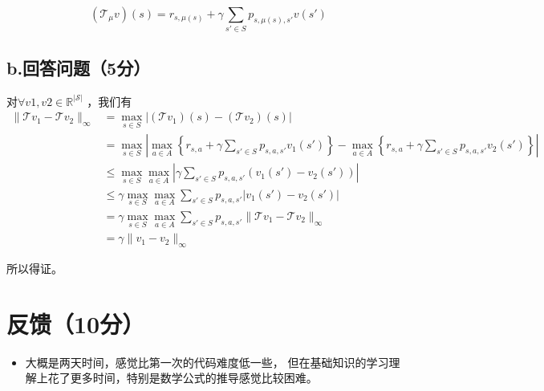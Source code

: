 \documentclass{article}
\begin{document}
\[
(\mathcal{T}_\mu v)(s) = r_{s,\mu(s)} + \gamma \sum_{s' \in S} p_{s,\mu(s),s'} v(s')
\]
\subsection*{b.回答问题（5分）}
对$\forall  v1, v2 \in \mathbb{R}^{|\mathcal{S}|}$
，我们有\begin{align*}
    \|\mathcal{T} v_1 - \mathcal{T} v_2\|_\infty &= \max_{s \in S} |(\mathcal{T} v_1)(s) - (\mathcal{T} v_2)(s)| \\
    &= \max_{s \in S} \left|\max_{a \in A} \left\{r_{s,a} + \gamma \sum_{s' \in S} p_{s,a,s'} v_1(s')\right\} - \max_{a \in A} \left\{r_{s,a} + \gamma \sum_{s' \in S} p_{s,a,s'} v_2(s')\right\}\right| \\
    &\leq \max_{s \in S} \max_{a \in A} \left|\gamma \sum_{s' \in S} p_{s,a,s'} (v_1(s') - v_2(s'))\right| \\
    &\leq \gamma \max_{s \in S} \max_{a \in A} \sum_{s' \in S} p_{s,a,s'} |v_1(s') - v_2(s')| \\
    &= \gamma \max_{s \in S} \max_{a \in A} \sum_{s' \in S} p_{s,a,s'} \|\mathcal{T} v_1 - \mathcal{T} v_2\|_\infty \\
    &= \gamma \|v_1 - v_2\|_\infty
\end{align*}


所以得证。


\section*{反馈（10分）}

\begin{itemize}
    \item 大概是两天时间，感觉比第一次的代码难度低一些，
    但在基础知识的学习理解上花了更多时间，特别是数学公式的推导感觉比较困难。
    
\end{itemize}
\end{document}
